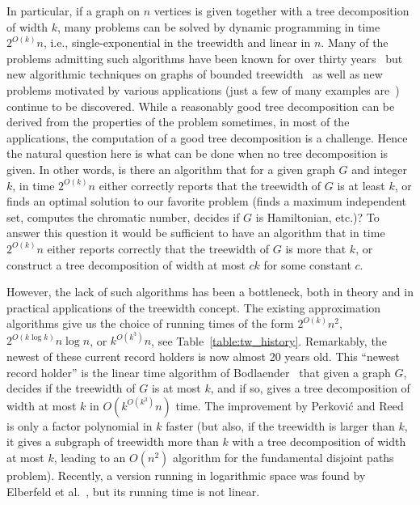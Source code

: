 \documentclass[a4paper,11pt]{article}
\theoremstyle{definition}
\theoremstyle{remark}
\begin{document}
In particular, if a graph on $n$ vertices is given together with a
tree decomposition of width $k$, many problems can be solved by
dynamic programming in time $2^{O(k)}n$, i.e., single-exponential in
the treewidth and linear in $n$.  Many of the problems admitting such
algorithms have been known for over thirty years~\cite{Bodlaender87}
but new algorithmic techniques on graphs of bounded
treewidth~\cite{BodlaenderCKN12, CyganKN12} as well as new problems
motivated by various applications (just a few of many examples
are~\cite{AbrahamBDR12,Gildea11,KosterHK02,RinaudoPBD12}) continue to
be discovered.  While a reasonably good tree decomposition can be
derived from the properties of the problem sometimes, in most of the
applications, the computation of a good tree decomposition is a
challenge.
Hence the natural question here is what can be done when no tree
decomposition is given.  In other words, is there an algorithm that
for a given graph $G$ and integer $k$, in time $2^{O(k)}n$ either
correctly reports that the treewidth of $G$ is at least $k$, or finds
an optimal solution to our favorite problem (finds a maximum
independent set, computes the chromatic number, decides if $G$ is
Hamiltonian, etc.)?  To answer this question it would be sufficient to
have an algorithm that in time $2^{O(k)}n$ either reports correctly
that the treewidth of $G$ is more that $k$, or construct a tree
decomposition of width at most $ck$ for some constant $c$.

However, the lack of such algorithms has been a bottleneck, both in
theory and in practical applications of the treewidth concept.  The
existing approximation algorithms give us the choice of running times
of the form $2^{O(k)} n^2$, $2^{O(k \log{k})} n\log{n}$, or
$k^{O(k^3)} n$, see Table~\ref{table:tw_history}.  Remarkably, the
newest of these current record holders is now almost 20 years old.
This ``newest record holder'' is the linear time algorithm of
Bodlaender~\cite{Bodlaender93s,Bodlaender96} that given a graph $G$,
decides if the treewidth of $G$ is at most $k$, and if so, gives a
tree decomposition of width at most $k$ in $O(k^{O(k^3)}n)$ time.  The
improvement by Perkovi{\'{c}} and Reed~\cite{PerkovicR00} is only a
factor polynomial in $k$ faster (but also, if the treewidth is larger
than $k$, it gives a subgraph of treewidth more than $k$ with a tree
decomposition of width at most $k$, leading to an $O(n^2)$ algorithm
for the fundamental disjoint paths problem).  Recently, a version
running in logarithmic space was found by Elberfeld et
al.~\cite{ElberfeldJT10}, but its running time is not linear.
\end{document}
